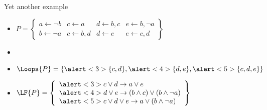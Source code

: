 \begin{frame}{Yet another example}
  \bigskip
  \begin{itemize}
  \item<1->
    \(
    P
    =
    \left\{
      \begin{array}{llll}
        a\leftarrow \neg b
      & c\leftarrow a
      & d\leftarrow b,c
      & e\leftarrow b,\neg a
      \\
        b\leftarrow \neg a
      & c\leftarrow b,d
      & d\leftarrow e
      & e\leftarrow c,d
      \end{array}
    \right\}
    \)
    \bigskip
  \item<1-> []
    \begin{center}
      
    \end{center}
  \item<1-> $\Loops{P}=\{\alert<3>{\{c,d\}},\alert<4>{\{d,e\}},\alert<5>{\{c,d,e\}}\}$
    \medskip
  \item<2->
    \(
    \LF{P}
    =
    \left\{
      \begin{array}[c]{l}
        \alert<3>{c\vee d\rightarrow a\vee e}\\
        \alert<4>{d\vee e\rightarrow (b\wedge c)\vee (b\wedge\neg a)}\\
        \alert<5>{c\vee d\vee e\rightarrow a \vee (b\wedge\neg a)}
      \end{array}
    \right\}
    \)
  \end{itemize}
\end{frame}
